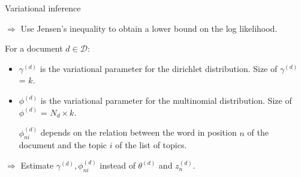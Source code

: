 \documentclass[final]{beamer}
\newlength{\onecolwid}
\newlength{\twocolwid}
\begin{document}
\begin{frame}[t]
\begin{columns}[t]
\begin{column}{\twocolwid}





\begin{columns}[t,totalwidth=\twocolwid] %

\begin{column}{\onecolwid} %


\begin{block}{Variational inference}

$\Rightarrow$ Use Jensen's inequality to obtain a lower bound on the log likelihood.

For a document $d \in \mathcal{D}$:
 \begin{itemize}
  \item $\gamma^{(d)}$ is the variational parameter for the dirichlet distribution. Size of $\gamma^{(d)}$ = $k$.
  \item $\phi^{(d)}$ is the variational parameter for the multinomial distribution. Size of $\phi^{(d)}$ = $N_d \times k$.
  
  $\phi_{ni}^{(d)}$ depends on the relation between the word in position $n$ of the document and the topic $i$ of the list of topics.
   \end{itemize}

$\Rightarrow$ Estimate $\gamma^{(d)}, \phi_{ni}^{(d)}$ instead of $\theta^{(d)}$ and $z_n^{(d)}$.


\end{block}
\end{column}
\end{columns}
\end{column}
\end{columns}
\end{frame}
\end{document}
